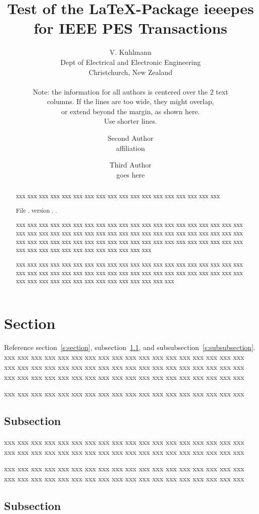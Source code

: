 \documentclass[10pt,twoside%
	]{article}
\title{Test of the \LaTeX-Package ieeepes for IEEE PES Transactions}
\author{
	V. Kuhlmann\\
	Dept of Electrical and Electronic Engineering\\
	Christchurch, New Zealand\\
	[.5ex]
	{\footnotesize
	Note: the information for all authors is centered over the 2 text\par
	columns. If the lines are too wide, they might overlap,\par
	or extend beyond the margin, as shown here.\par
	Use shorter lines.\par}
\and
	Second Author\\
	affiliation
\and
	Third Author\\
	goes here
}
\begin{document}
\maketitle


\begin{abstract}
xxx xxx xxx xxx xxx xxx xxx xxx xxx xxx xxx xxx xxx xxx xxx xxx xxx xxx 

File \Filename, version \Fileversion, \Filedate.

xxx xxx xxx xxx xxx xxx xxx xxx xxx xxx xxx xxx xxx xxx xxx xxx xxx xxx 
xxx xxx xxx xxx xxx xxx xxx xxx xxx xxx xxx xxx xxx xxx xxx xxx xxx xxx 
xxx xxx xxx xxx xxx xxx xxx xxx xxx xxx xxx xxx xxx xxx xxx xxx xxx xxx 
xxx xxx xxx xxx xxx xxx xxx xxx xxx xxx xxx xxx xxx xxx xxx xxx xxx xxx 

xxx xxx xxx xxx xxx xxx xxx xxx xxx xxx xxx xxx xxx xxx xxx xxx xxx xxx 
xxx xxx xxx xxx xxx xxx xxx xxx xxx xxx xxx xxx xxx xxx xxx xxx xxx xxx 
xxx xxx xxx xxx xxx xxx xxx xxx xxx xxx xxx xxx xxx xxx xxx xxx xxx xxx 
\end{abstract}



\section{Section}

Reference section~\ref{s:section}, 
subsection~\ref{s:subsection}, and
subsubsection~\ref{s:subsubsection}.
xxx xxx xxx xxx xxx xxx xxx xxx xxx xxx xxx xxx xxx xxx xxx xxx xxx xxx 
xxx xxx xxx xxx xxx xxx xxx xxx xxx xxx xxx xxx xxx xxx xxx xxx xxx xxx 
xxx xxx xxx xxx xxx xxx xxx xxx xxx xxx xxx xxx xxx xxx xxx xxx xxx xxx 

xxx xxx xxx xxx xxx xxx xxx xxx xxx xxx xxx xxx xxx xxx xxx xxx xxx xxx 


\subsection{Subsection}
\label{s:subsection}

xxx xxx xxx xxx xxx xxx xxx xxx xxx xxx xxx xxx xxx xxx xxx xxx xxx xxx 
xxx xxx xxx xxx xxx xxx xxx xxx xxx xxx xxx xxx xxx xxx xxx xxx xxx xxx 

xxx xxx xxx xxx xxx xxx xxx xxx xxx xxx xxx xxx xxx xxx xxx xxx xxx xxx 
xxx xxx xxx xxx xxx xxx xxx xxx xxx xxx xxx xxx xxx xxx xxx xxx xxx xxx 


\subsection{Subsection}
\end{document}
